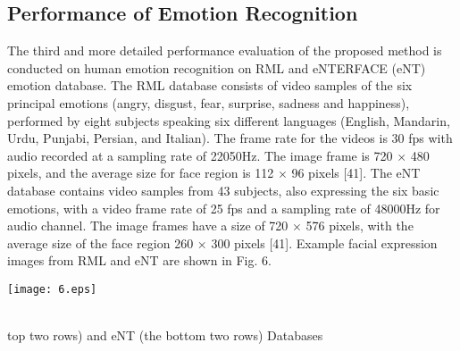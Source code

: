 \documentclass[journal]{IEEEtran}
\begin{document}
\subsection{Performance of Emotion Recognition}
The third and more detailed performance evaluation of the proposed method is conducted on human emotion recognition on RML and eNTERFACE (eNT) emotion database. The RML database consists of video samples of the six principal emotions  (angry, disgust, fear, surprise, sadness and happiness), performed by eight subjects speaking six different languages  (English, Mandarin, Urdu, Punjabi, Persian, and Italian). The frame rate for the videos is 30 fps with audio recorded at a sampling rate of 22050Hz. The image frame is 720 $\times$ 480 pixels, and the average size for face region is 112 $\times$ 96 pixels [41]. The eNT database contains video samples from 43 subjects, also expressing the six basic emotions, with a video frame rate of 25 fps and a sampling rate of 48000Hz for audio channel. The image frames have a size of 720 $\times$ 576 pixels, with the average size of the face region 260 $\times$ 300 pixels [41]. Example facial expression images from RML and eNT are shown in Fig. 6.\\\indent
\centerline {\texttt{[image: 6.eps]}}\\   {top two rows) and eNT (the bottom two rows) Databases}\\\indent
\end{document}
